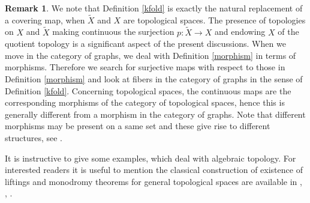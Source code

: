 \documentclass{amsart}
\theoremstyle{definition}
\newtheorem{rem}[theo]{Remark}
\numberwithin{equation}{section}
\begin{document}
 \begin{rem}\label{crucialanalogy} We note that Definition \ref{kfold} is exactly the natural replacement of a covering map, when $\widetilde{X}$ and $X$ are topological spaces. The presence of topologies on $X$ and $\widetilde{X}$ making continuous the surjection $p : \widetilde{X} \to X$ and endowing $X$ of the quotient topology is a significant aspect of the  present discussions. When we move in the category of graphs, we deal with Definition   \ref{morphism} in terms of morphisms. Therefore we search for surjective maps with respect to those in Definition \ref{morphism} and look at fibers in the category of graphs in the sense of Definition \ref{kfold}. Concerning topological spaces, the continuous maps are the corresponding morphisms of the category of topological spaces, hence this is generally different from a morphism in the category of graphs. Note that different morphisms may be present on a same set and these give rise to different structures, see \cite[Appendix 3]{hofmor}.
 \end{rem}
It is instructive to give some examples, which  deal with  algebraic topology. For interested readers it is useful to mention the classical construction of existence of liftings and monodromy theorems for general topological spaces are available in  \cite[Appendix 2]{hofmor}, \cite{ttd},  \cite[Theorem 17.6, Corollary 17.7]{kos}. 
\end{document}
